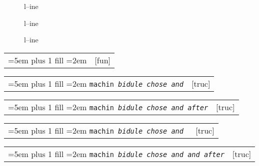 \documentclass{book}
\begin{document}
\begin{description}
\item[{\parbox[b]{\linewidth}{%
a}}]
l--ine
\end{description}

\begin{description}
\item[{\parbox[b]{\linewidth}{%
a--missing style formatting}}]
l--ine
\end{description}

\begin{description}
\item[{\parbox[b]{\linewidth}{%
a\\
\index[fn]{a@\texttt{a}}%
\index[cp]{index entry between item and itemx}%
b
\index[fn]{b@\texttt{b}}%
}}]
l--ine
\end{description}


\noindent\begin{tabularx}{\linewidth}{@{}Xr}
\rightskip=5em plus 1 fill
\hangindent=2em
\texttt{}& [fun]
\end{tabularx}


\noindent\begin{tabularx}{\linewidth}{@{}Xr}
\rightskip=5em plus 1 fill
\hangindent=2em
\texttt{machin \EmbracOn{}\textnormal{\textsl{bidule chose and}}\EmbracOff{}}& [truc]
\end{tabularx}

%

\noindent\begin{tabularx}{\linewidth}{@{}Xr}
\rightskip=5em plus 1 fill
\hangindent=2em
\texttt{machin \EmbracOn{}\textnormal{\textsl{bidule chose and  after}}\EmbracOff{}}& [truc]
\end{tabularx}

%

\noindent\begin{tabularx}{\linewidth}{@{}Xr}
\rightskip=5em plus 1 fill
\hangindent=2em
\texttt{machin \EmbracOn{}\textnormal{\textsl{bidule chose and }}\EmbracOff{}}& [truc]
\end{tabularx}

%

\noindent\begin{tabularx}{\linewidth}{@{}Xr}
\rightskip=5em plus 1 fill
\hangindent=2em
\texttt{machin \EmbracOn{}\textnormal{\textsl{bidule chose and and after}}\EmbracOff{}}& [truc]
\end{tabularx}
\end{document}
